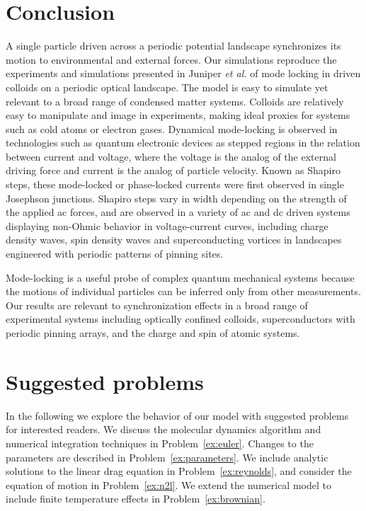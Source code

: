 \documentclass[preprint,showpacs,preprintnumbers,amsmath,amssymb,aps,prb]{revtex4-1}
\theoremstyle{remark}
\begin{document}
\section{Conclusion}
\label{sec:conclusion}	
A single particle driven across a periodic potential landscape 
synchronizes its motion 
to environmental and external forces.  
Our simulations reproduce the experiments and simulations presented in 
Juniper {\it et al.} \cite{Juniper2015, Juniper2017}
of 
mode locking in
driven colloids on a
periodic optical landscape.
The model
is easy to simulate yet relevant
to a broad range of condensed matter systems.
Colloids are 
relatively easy to 
manipulate and image in experiments,
making ideal proxies 
for systems 
such as cold atoms or electron gases.\cite{Grier2003}
Dynamical mode-locking 
is 
observed in  technologies such as 
 quantum electronic
devices as 
stepped regions in the relation between current and voltage,
where the voltage is the analog of the external driving force
and current is the analog of particle velocity.
Known as Shapiro steps, 
these mode-locked or phase-locked currents
were first
observed in single Josephson junctions\cite{Shapiro1963, Golubov2004}.
Shapiro steps vary in width depending on the strength of the
applied ac forces,
and are observed in a variety of ac and dc driven systems
displaying
non-Ohmic behavior in voltage-current curves,
including
charge density waves, spin density waves
and superconducting vortices in landscapes 
engineered with periodic patterns of pinning sites.\cite{Reichhardt2000}

Mode-locking is a useful probe 
of complex quantum mechanical systems
because the motions of individual particles can  be inferred only
from other measurements.
Our results are relevant 
to synchronization effects
in a broad range of experimental systems
including optically confined colloids,
superconductors with periodic pinning arrays, 
and the charge and spin of atomic systems.

\section{Suggested problems}
\label{sec:problems}	

In the following
we explore the behavior of our model
with suggested problems for interested readers.
We discuss the molecular dynamics algorithm
and
numerical integration techniques in Problem~\ref{ex:euler}.
Changes to the parameters are described in 
Problem~\ref{ex:parameters}.
We include analytic solutions to  the 
linear drag equation in Problem~\ref{ex:reynolds}, and consider
the equation of motion in Problem~\ref{ex:n2l}.
We extend the numerical model  
to include finite temperature effects
in Problem~\ref{ex:brownian}.
\end{document}
